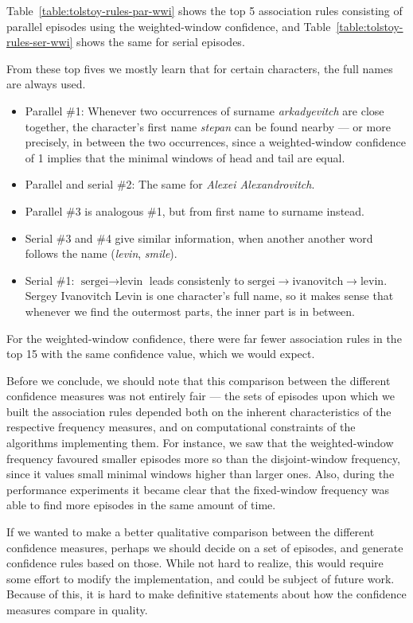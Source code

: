 Table~\ref{table:tolstoy-rules-par-wwi} shows the top 5 association rules consisting of parallel episodes using the weighted-window confidence, and Table~\ref{table:tolstoy-rules-ser-wwi} shows the same for serial episodes.

From these top fives we mostly learn that for certain characters, the full names are always used.

\begin{itemize}
\item Parallel \#1: Whenever two occurrences of surname \emph{arkadyevitch} are close together, the character's first name \emph{stepan} can be found nearby --- or more precisely, in between the two occurrences, since a weighted-window confidence of 1 implies that the minimal windows of head and tail are equal.
\item Parallel and serial \#2: The same for \emph{Alexei Alexandrovitch}.
\item Parallel \#3 is analogous \#1, but from first name to surname instead.
\item Serial \#3 and \#4 give similar information, when another another word follows the name (\emph{levin}, \emph{smile}).
\item Serial \#1: $ \text{sergei} \to \text{levin} $ leads consistenly to $ \text{sergei} \to \text{ivanovitch} \to \text{levin} $. Sergey Ivanovitch Levin is one character's full name, so it makes sense that whenever we find the outermost parts, the inner part is in between.
\end{itemize}


For the weighted-window confidence, there were far fewer association rules in the top 15 with the same confidence value, which we would expect.

Before we conclude, we should note that this comparison between the different confidence measures was not entirely fair --- the sets of episodes upon which we built the association rules depended both on the inherent characteristics of the respective frequency measures, and on computational constraints of the algorithms implementing them. For instance, we saw that the weighted-window frequency favoured smaller episodes more so than the disjoint-window frequency, since it values small minimal windows higher than larger ones. Also, during the performance experiments it became clear that the fixed-window frequency was able to find more episodes in the same amount of time.

If we wanted to make a better qualitative comparison between the different confidence measures, perhaps we should decide on a set of episodes, and generate confidence rules based on those. While not hard to realize, this would require some effort to modify the implementation, and could be subject of future work. Because of this, it is hard to make definitive statements about how the confidence measures compare in quality.

